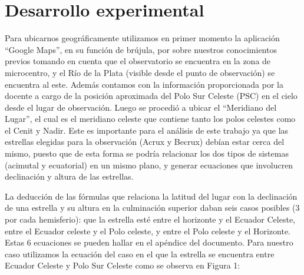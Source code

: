 \documentclass[11pt, a4paper]{article} %
\begin{document}
\section{Desarrollo experimental}
Para ubicarnos geográficamente utilizamos en primer momento la aplicación “Google Maps”, en su función de brújula, por sobre nuestros conocimientos previos tomando en cuenta que el observatorio se encuentra en la zona de microcentro, y el Río de la Plata (visible desde el punto de observación) se encuentra al este. Además contamos con la información proporcionada por la docente a cargo de la posición aproximada del Polo Sur Celeste (PSC) en el cielo desde el lugar de observación. Luego se procedió a ubicar el “Meridiano del Lugar”, el cual es el meridiano celeste que contiene tanto los polos celestes como el Cenit y Nadir. Este es importante para el análisis de este trabajo ya que las estrellas elegidas para la observación (Acrux y Becrux) debían estar cerca del mismo, puesto que de esta forma se podría relacionar los dos tipos de sistemas (acimutal y ecuatorial) en un mismo plano, y generar ecuaciones que involucren declinación y altura de las estrellas. 

La deducción de las fórmulas que relaciona la latitud del lugar con la declinación de una estrella y su altura en la culminación superior daban seis casos posibles (3 por cada hemisferio): que la estrella esté entre el horizonte y el Ecuador Celeste, entre el Ecuador celeste y el Polo celeste, y entre el Polo celeste y el Horizonte. Estas 6 ecuaciones se pueden hallar en el apéndice del documento. 
Para nuestro caso utilizamos la ecuación del caso en el que la estrella se encuentra entre Ecuador Celeste y Polo Sur Celeste como se observa en Figura 1:
\end{document}
